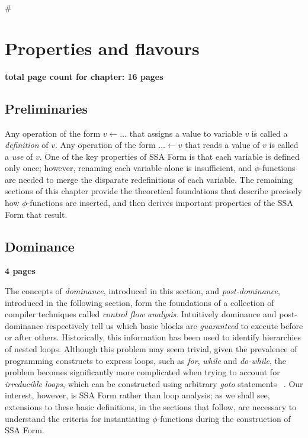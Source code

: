 #\chapter{Properties and flavours }

\textbf{total page count for chapter: 16 pages}

\section{Preliminaries}

Any operation of the form $v \leftarrow \ldots$ that assigns a value
to variable $v$ is called a \emph{definition} of $v$. Any operation
of the form $\ldots \leftarrow v$ that reads a value of $v$ is called
a \emph{use} of $v$. One of the key properties of SSA Form is that
each variable is defined only once; however, renaming each variable 
alone is insufficient, and $\phi$-functions are needed to merge
the disparate redefinitions of each variable. The remaining 
sections of this chapter provide the theoretical foundations that
describe precisely how $\phi$-functions are inserted, and then
derives important properties of the SSA Form that result. 

\section{Dominance}

\textbf{4 pages}

The concepts of \emph{dominance}, introduced in this section, and 
\emph{post-dominance}, introduced in the following section, form the
foundations of a collection of compiler techniques called 
\emph{control flow analysis}. Intuitively dominance and post-dominance
respectively tell us which basic blocks are \emph{guaranteed} to
execute before or after others. Historically, this information has
been used to identify hierarchies of nested loops. Although this
problem may seem trivial, given the prevalence of programming 
constructs to express loops, such as \emph{for}, \emph{while} and
\emph{do-while}, the problem becomes significantly more complicated
when trying to account for \emph{irreducible loops}, which can be
constructed using arbitrary \emph{goto} statements
~\cite{RamlingamSep02}. Our interest, however, is SSA Form
rather than loop analysis; as we shall see, extensions to these
basic definitions, in the sections that follow, are necessary to
understand the criteria for instantiating $\phi$-functions 
during the construction of SSA Form. 

